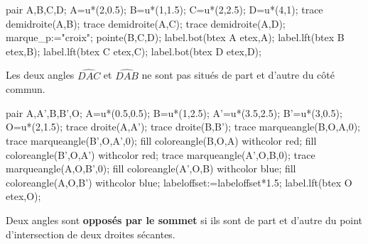 \begin{changemargin}{0mm}{-25mm}
\begin{remarques}
\begin{changemargin}{-10mm}{-10mm}
\begin{minipage}{0.4\linewidth}
\begin{center}
\begin{Geometrie}[CoinHD={(5u,4.3u)}]
                  pair A,B,C,D;
                  A=u*(2,0.5);
                  B=u*(1,1.5);
                  C=u*(2,2.5);
                  D=u*(4,1);
                  trace demidroite(A,B);
                  trace demidroite(A,C);
                  trace demidroite(A,D);
                  marque_p:="croix";
                  pointe(B,C,D);            
                  label.bot(btex A etex,A);
                  label.lft(btex B etex,B);
                  label.lft(btex C etex,C);
                  label.bot(btex D etex,D);
               \end{Geometrie}
               \par
               Les deux angles $\widehat{DAC}$ et $\widehat{DAB}$ ne sont pas situés de part et d'autre du côté commun. 
            \end{center}
         \end{minipage}
      \end{changemargin}
   \end{remarques}

   \begin{definition}
      \begin{minipage}{0.3\linewidth}
         \begin{center}
            \begin{Geometrie}[CoinHD={(5u,3u)}]
               pair A,A',B,B',O;
               A=u*(0.5,0.5);
               B=u*(1,2.5);
               A'=u*(3.5,2.5);
               B'=u*(3,0.5);
               O=u*(2,1.5);
               trace droite(A,A');
               trace droite(B,B');
               trace marqueangle(B,O,A,0);
               trace marqueangle(B',O,A',0);
               fill coloreangle(B,O,A) withcolor red;
               fill coloreangle(B',O,A') withcolor red;
               trace marqueangle(A',O,B,0);
               trace marqueangle(A,O,B',0);
               fill coloreangle(A',O,B) withcolor blue;
               fill coloreangle(A,O,B') withcolor blue;
               labeloffset:=labeloffset*1.5;
               label.lft(btex O etex,O);
            \end{Geometrie}
         \end{center}
      \end{minipage}
      \hfill
      \begin{minipage}{0.6\linewidth}
         Deux angles sont {\bfseries opposés par le sommet} si ils sont de part et d'autre du point d'intersection de deux droites sécantes.
      \end{minipage}
   \end{definition}


\end{changemargin}

